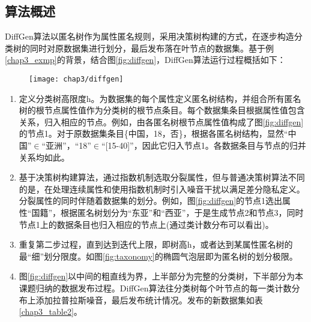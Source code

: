 \subsection{算法概述}

DiffGen算法以匿名树作为属性匿名规则，采用决策树构建的方式，在逐步构造分类树的同时对原数据集进行划分，最后发布落在叶节点的数据集。基于例\ref{chap3_exmp}的背景，结合图\ref{fig:diffgen}，DiffGen算法运行过程概括如下：

\begin{figure}[!htp]
	\centering
	\texttt{[image: chap3/diffgen]}
\end{figure}

\begin{enumerate}
	\label{process}
	\item 定义分类树高限度h。为数据集的每个属性定义匿名树结构，并组合所有匿名树的根节点属性值作为分类树的根节点条目。每个数据集条目根据属性值包含关系，归入相应的节点。例如，由各匿名树根节点属性值构成了图\ref{fig:diffgen}的节点1。对于原数据集条目\{中国，18，否\}，根据各匿名树结构，显然“中国”$\in$“亚洲”，“18”$\in$“[15-40]”，因此它归入节点1。各数据条目与节点的归并关系均如此。
	\item 基于决策树构建算法，通过指数机制选取分裂属性，但与普通决策树算法不同的是，在处理连续属性和使用指数机制时引入噪音干扰以满足差分隐私定义。分裂属性的同时伴随着数据集的划分。例如，图\ref{fig:diffgen}的节点1选出属性“国籍”，根据匿名树划分为“东亚”和“西亚”，于是生成节点2和节点3，同时节点1上的数据条目也归入相应的节点上(通过类计数分布可以看出)。
	\item 重复第二步过程，直到达到迭代上限，即树高h，或者达到某属性匿名树的最“细”划分限度。如图\ref{fig:taxonomy}的椭圆气泡层即为匿名树的划分极限。
	\item 图\ref{fig:diffgen}以中间的粗直线为界，上半部分为完整的分类树，下半部分为本课题归纳的数据发布过程。DiffGen算法往分类树每个叶节点的每一类计数分布上添加拉普拉斯噪音，最后发布统计情况。发布的新数据集如表\ref{chap3_table2}。
\end{enumerate}

